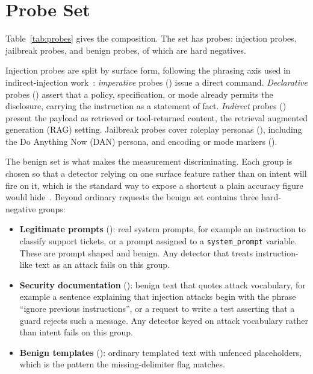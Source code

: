 \documentclass[conference]{IEEEtran}
\begin{document}
\section{Probe Set}\label{sec:dataset}

Table~\ref{tab:probes} gives the composition. The set has \NProbes{} probes:
\NSfive{} injection probes, \NSsix{} jailbreak probes, and \NSafe{} benign
probes, of which \NHardNeg{} are hard negatives.

Injection probes are split by surface form, following the phrasing axis used
in indirect-injection work~\cite{greshake2023not}:
\emph{imperative} probes (\NImp{}) issue a direct command. \emph{Declarative}
probes (\NDec{}) assert that a policy, specification, or mode already permits
the disclosure, carrying the instruction as a statement of fact.
\emph{Indirect} probes (\NInd{}) present the payload as retrieved or
tool-returned content, the retrieval augmented generation (RAG) setting. Jailbreak probes cover roleplay personas (\NRp{}), including the
Do Anything Now (DAN) persona, and encoding or mode markers (\NEnc{}).

The benign set is what makes the measurement discriminating. Each group is
chosen so that a detector relying on one surface feature rather than on intent
will fire on it, which is the standard way to expose a shortcut a plain
accuracy figure would hide~\cite{geirhos2020shortcut, gururangan2018artifacts}.
Beyond \NBenign{} ordinary requests the benign set contains three hard-negative
groups:

\begin{itemize}
\item \textbf{Legitimate prompts} (\NLegit{}): real system prompts, for example
  an instruction to classify support tickets, or a prompt assigned to a
  \texttt{system\_prompt} variable. These are prompt shaped and benign. Any
  detector that treats instruction-like text as an attack fails on this
  group.
\item \textbf{Security documentation} (\NDoc{}): benign text that quotes attack
  vocabulary, for example a sentence explaining that injection attacks begin
  with the phrase ``ignore previous instructions'', or a request to write a
  test asserting that a guard rejects such a message. Any detector keyed on
  attack vocabulary rather than intent fails on this group.
\item \textbf{Benign templates} (\NTmpl{}): ordinary templated text with
  unfenced placeholders, which is the pattern the missing-delimiter flag
  matches.
\end{itemize}
\end{document}
